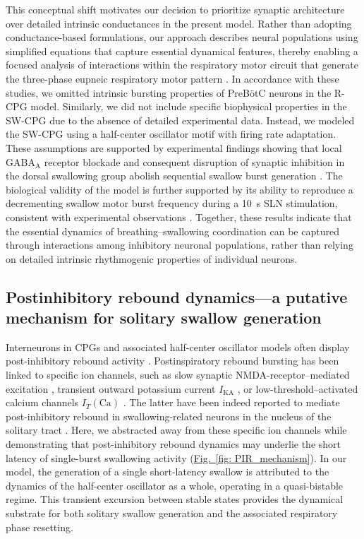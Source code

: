 \documentclass[pdflatex,sn-mathphys-ay]{sn-jnl}%
\renewcommand{\figureautorefname}{Fig.}
\newcommand{\Figref}[2][]{\hyperref[#2]{\figureautorefname~\ref*{#2}#1}}
\theoremstyle{thmstyleone}%
\theoremstyle{thmstyletwo}%
\theoremstyle{thmstylethree}%
\begin{document}
This conceptual shift motivates our decision to prioritize synaptic architecture over detailed intrinsic conductances in the present model. Rather than adopting conductance-based formulations, our approach describes neural populations using simplified equations that capture essential dynamical features, thereby enabling a focused analysis of interactions within the respiratory motor circuit that generate the three-phase eupneic respiratory motor pattern \citep{molkov2017computational, tolmachev2018modeling}. In accordance with these studies, we omitted intrinsic bursting properties of PreBötC neurons in the R-CPG model. Similarly, we did not include specific biophysical properties in the SW-CPG due to the absence of detailed experimental data. Instead, we modeled the SW-CPG using a half-center oscillator motif with firing rate adaptation. These assumptions are supported by experimental findings showing that local $\text{GABA}_{\text{A}}$ receptor blockade and consequent disruption of synaptic inhibition in the dorsal swallowing group abolish sequential swallow burst generation \citep{bautista2014ponto}. The biological validity of the model is further supported by its ability to reproduce a decrementing swallow motor burst frequency during a 10~s SLN stimulation, consistent with experimental observations \citep{fuse2019effects, fuse2025spatio, takemura2022effect, hashimoto2019activity, kinoshita2021influences}. 
Together, these results indicate that the essential dynamics of breathing–swallowing coordination can be captured through interactions among inhibitory neuronal populations, rather than relying on detailed intrinsic rhythmogenic properties of individual neurons.

\subsection{Postinhibitory rebound dynamics---a putative mechanism for solitary swallow generation}
Interneurons in CPGs and associated half-center oscillator models often display post-inhibitory rebound activity \citep{hooper2001central, bucher2015central, nagornov2016mixed, jean2001brain}. Postinspiratory rebound bursting has been linked to specific ion channels, such as slow synaptic NMDA-receptor–mediated excitation \citep{jean2001brain, tell1993ionic}, transient outward potassium current $I_{\text{KA}}$ \citep{jean2001brain, tell1991activation}, or low-threshold–activated calcium channels $I_T(\text{Ca})$ \citep{tell1994whole, champagnat1986voltage, jean2006electrophysiologic}. The latter have been indeed reported to mediate post-inhibitory rebound in swallowing-related neurons in the nucleus of the solitary tract \citep{tell1994whole, champagnat1986voltage, jean2006electrophysiologic}.
Here, we abstracted away from these specific ion channels while demonstrating that post-inhibitory rebound dynamics may underlie the short latency of single-burst swallowing activity (\Figref[]{fig: PIR_mechanism}). In our model, the generation of a single short-latency swallow is attributed to the dynamics of the half-center oscillator as a whole, operating in a quasi-bistable regime. This transient excursion between stable states provides the dynamical substrate for both solitary swallow generation and the associated respiratory phase resetting.
\end{document}
